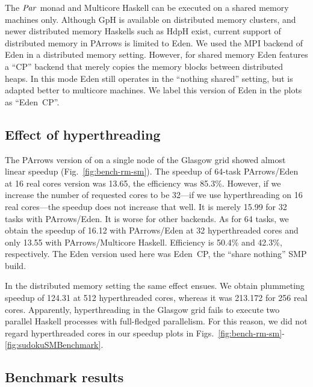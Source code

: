 The \ensuremath{\Conid{Par}} monad and Multicore Haskell can be executed on a shared
memory machines only. Although GpH is available on distributed memory
clusters, and newer distributed memory Haskells such as HdpH exist,
current support of distributed memory in PArrows is limited to
Eden. We used the MPI backend of Eden in a distributed memory
setting. However, for shared memory Eden features a ``CP'' backend
that merely copies the memory blocks between distributed heaps. In
this mode Eden still operates in the ``nothing shared'' setting, but
is adapted better to multicore machines. We label this version of Eden
in the plots as ``Eden~CP''.



\subsection{Effect of hyperthreading}

The PArrows version of \rmtest on a single node of the Glasgow grid
showed almost linear speedup (Fig.~\ref{fig:bench-rm-sm}). The speedup
of 64-task PArrows/Eden at 16 real cores version was 13.65, the
efficiency was 85.3\%.  However, if we increase the number of
requested cores to be 32---\ie if we use hyperthreading on 16 real
cores---the speedup does not increase that well. It is merely 15.99
for 32 tasks with PArrows/Eden. It is worse for other backends.  As
for 64 tasks, we obtain the speedup of 16.12 with PArrows/Eden at 32
hyperthreaded cores and only 13.55 with PArrows/Multicore
Haskell. Efficiency is 50.4\% and 42.3\%, respectively. The Eden
version used here was Eden~CP, the ``share nothing'' SMP build.

In the distributed memory setting the same effect ensues. We obtain
plummeting speedup of 124.31 at 512 hyperthreaded cores, whereas it was
213.172 for 256 real cores. Apparently, hyperthreading in the Glasgow
grid fails to execute two parallel Haskell processes with full-fledged
parallelism. For this reason, we did not regard hyperthreaded cores in
our speedup plots in Figs.~\ref{fig:bench-rm-sm}-\ref{fig:sudokuSMBenchmark}.




\subsection{Benchmark results}

